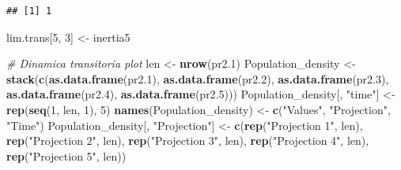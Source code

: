 \documentclass[
]{book}
\newenvironment{Shaded}{\begin{snugshade}}{\end{snugshade}}
\newcommand{\CommentTok}[1]{\textcolor[rgb]{0.56,0.35,0.01}{\textit{#1}}}
\newcommand{\DecValTok}[1]{\textcolor[rgb]{0.00,0.00,0.81}{#1}}
\newcommand{\FloatTok}[1]{\textcolor[rgb]{0.00,0.00,0.81}{#1}}
\newcommand{\FunctionTok}[1]{\textcolor[rgb]{0.13,0.29,0.53}{\textbf{#1}}}
\newcommand{\NormalTok}[1]{#1}
\newcommand{\OtherTok}[1]{\textcolor[rgb]{0.56,0.35,0.01}{#1}}
\newcommand{\StringTok}[1]{\textcolor[rgb]{0.31,0.60,0.02}{#1}}
\theoremstyle{definition}
\theoremstyle{definition}
\theoremstyle{definition}
\theoremstyle{definition}
\theoremstyle{remark}
\begin{document}
\begin{verbatim}
## [1] 1
\end{verbatim}

\begin{Shaded}
\begin{Highlighting}[]
\NormalTok{lim.trans[}\DecValTok{5}\NormalTok{, }\DecValTok{3}\NormalTok{] }\OtherTok{\textless{}{-}}\NormalTok{ inertia5}

\CommentTok{\# Dinamica transitoria plot}
\NormalTok{len }\OtherTok{\textless{}{-}} \FunctionTok{nrow}\NormalTok{(pr2}\FloatTok{.1}\NormalTok{)}
\NormalTok{Population\_density }\OtherTok{\textless{}{-}} \FunctionTok{stack}\NormalTok{(}\FunctionTok{c}\NormalTok{(}\FunctionTok{as.data.frame}\NormalTok{(pr2}\FloatTok{.1}\NormalTok{), }\FunctionTok{as.data.frame}\NormalTok{(pr2}\FloatTok{.2}\NormalTok{), }\FunctionTok{as.data.frame}\NormalTok{(pr2}\FloatTok{.3}\NormalTok{), }\FunctionTok{as.data.frame}\NormalTok{(pr2}\FloatTok{.4}\NormalTok{), }\FunctionTok{as.data.frame}\NormalTok{(pr2}\FloatTok{.5}\NormalTok{)))}
\NormalTok{Population\_density[, }\StringTok{"time"}\NormalTok{] }\OtherTok{\textless{}{-}} \FunctionTok{rep}\NormalTok{(}\FunctionTok{seq}\NormalTok{(}\DecValTok{1}\NormalTok{, len, }\DecValTok{1}\NormalTok{), }\DecValTok{5}\NormalTok{)}
\FunctionTok{names}\NormalTok{(Population\_density) }\OtherTok{\textless{}{-}} \FunctionTok{c}\NormalTok{(}\StringTok{"Values"}\NormalTok{, }\StringTok{"Projection"}\NormalTok{, }\StringTok{"Time"}\NormalTok{)}
\NormalTok{Population\_density[, }\StringTok{"Projection"}\NormalTok{] }\OtherTok{\textless{}{-}} \FunctionTok{c}\NormalTok{(}\FunctionTok{rep}\NormalTok{(}\StringTok{"Projection 1"}\NormalTok{, len), }\FunctionTok{rep}\NormalTok{(}\StringTok{"Projection 2"}\NormalTok{, len), }\FunctionTok{rep}\NormalTok{(}\StringTok{"Projection 3"}\NormalTok{, len), }\FunctionTok{rep}\NormalTok{(}\StringTok{"Projection 4"}\NormalTok{, len), }\FunctionTok{rep}\NormalTok{(}\StringTok{"Projection 5"}\NormalTok{, len))}


\end{Highlighting}
\end{Shaded}
\end{document}
